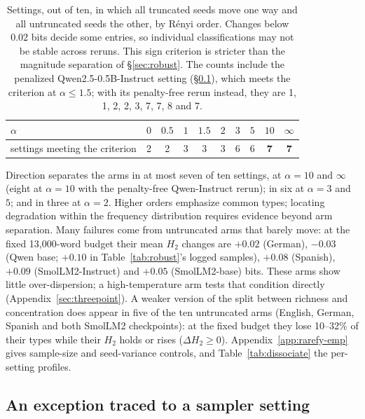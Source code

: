 \documentclass[10pt]{article}
\theoremstyle{plain}
\theoremstyle{definition}
\newcommand{\Htwo}{H_2}
\begin{document}
\begin{table}[t]
\centering\small
\caption{Settings, out of ten, in which all truncated seeds move one way and all untruncated
seeds the other, by R\'enyi order. Changes below $0.02$ bits decide some entries, so individual
classifications may not be stable across reruns. This sign criterion is stricter than the
magnitude separation of \S\ref{sec:robust}. The counts include the penalized
Qwen2.5-0.5B-Instruct setting (\S\ref{sec:richness}), which meets the criterion at $\alpha\le1.5$;
with its penalty-free rerun instead, they are 1, 1, 2, 2, 3, 7, 7, 8 and 7.}
\label{tab:sweep}
\begin{tabular}{lccccccccc}
\toprule
$\alpha$ & $0$ & $0.5$ & $1$ & $1.5$ & $2$ & $3$ & $5$ & $10$ & $\infty$ \\
\midrule
settings meeting the criterion & 2 & 2 & 3 & 3 & 3 & 6 & 6 & \textbf{7} & \textbf{7} \\
\bottomrule
\end{tabular}
\end{table}

Direction separates the arms in at most seven of ten settings, at $\alpha=10$ and $\infty$
(eight at $\alpha=10$ with the penalty-free Qwen-Instruct rerun); in
six at $\alpha=3$ and $5$; and in three at $\alpha=2$. Higher orders emphasize common types;
locating degradation within the frequency distribution requires evidence beyond arm separation. Many failures come
from untruncated arms that barely move: at the fixed 13,000-word budget their mean $\Htwo$
changes are $+0.02$ (German), $-0.03$ (Qwen base; $+0.10$ in Table~\ref{tab:robust}'s logged samples), $+0.08$ (Spanish), $+0.09$
(SmolLM2-Instruct) and $+0.05$ (SmolLM2-base) bits. These arms show little over-dispersion; a
high-temperature arm tests that condition directly (Appendix~\ref{sec:threepoint}). A weaker
version of the split between richness and concentration does appear in five of the ten
untruncated arms (English, German, Spanish and both SmolLM2 checkpoints): at the fixed budget they
lose 10--32\% of their types while their $\Htwo$ holds or rises ($\Delta\Htwo\ge0$). Appendix~\ref{app:rarefy-emp}
gives sample-size and seed-variance controls, and Table~\ref{tab:dissociate} the per-setting
profiles.

\subsection{An exception traced to a sampler setting}
\label{sec:richness}
\end{document}
